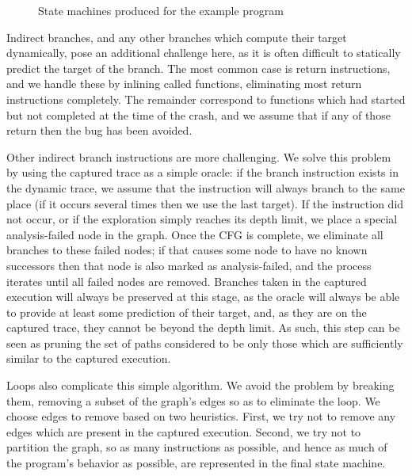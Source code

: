 \documentclass[10pt,twocolumn,preprint,natbib,authoryear]{sigplanconf}
\newcommand{\editorial}[1]{}
\begin{document}
\begin{figure*}[t]
\caption{State machines produced for the example program}
\end{figure*}


Indirect branches, and any other branches which compute their target
dynamically, pose an additional challenge here, as it is often
difficult to statically predict the target of the branch.  The most
common case is return instructions, and we handle these by inlining
called functions, eliminating most return instructions completely.
The remainder correspond to functions which had started but not
completed at the time of the crash, and we assume that if any of those
return then the bug has been avoided.

Other indirect branch instructions are more challenging.  We solve
this problem by using the captured trace as a simple oracle: if the
branch instruction exists in the dynamic trace, we assume that the
instruction will always branch to the same place (if it occurs several
times then we use the last target).  If the instruction did not occur,
or if the exploration simply reaches its depth limit, we place a
special analysis-failed node in the graph.  Once the CFG is complete,
we eliminate all branches to these failed nodes; if that causes some
node to have no known successors then that node is also marked as
analysis-failed, and the process iterates until all failed nodes are
removed.  Branches taken in the captured execution will always be
preserved at this stage, as the oracle will always be able to provide
at least some prediction of their target, and, as they are on the
captured trace, they cannot be beyond the depth limit\editorial{Not
  sure that's very clear}.  As such, this step can be seen as pruning
the set of paths considered to be only those which are sufficiently
similar to the captured execution.

Loops also complicate this simple algorithm.  We avoid the problem by
breaking them, removing a subset of the graph's edges so as to
eliminate the loop.  We choose edges to remove based on two
heuristics.  First, we try not to remove any edges which are present
in the captured execution.  Second, we try not to partition the graph,
so as many instructions as possible, and hence as much of the
program's behavior as possible, are represented in the final state
machine.
\end{document}
